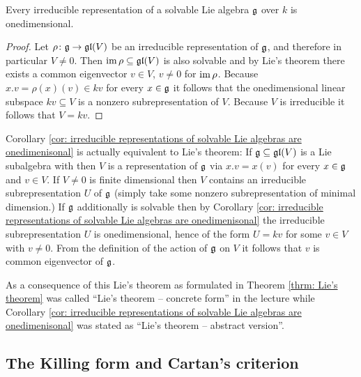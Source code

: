 \begin{cor}\label{cor: irreducible representations of solvable Lie algebras are onedimenisonal}
 Every irreducible representation of a solvable Lie algebra $\mathfrak{g}$ over $k$ is onedimensional.
\end{cor}
\begin{proof}
 Let $\rho \colon \mathfrak{g} \to \mathfrak{gl}(V)$ be an irreducible representation of $\mathfrak{g}$, and therefore in particular $V \neq 0$. Then $\operatorname{im} \rho \subseteq \mathfrak{gl}(V)$ is also solvable and by Lie’s theorem there exists a common eigenvector $v \in V$, $v \neq 0$ for $\operatorname{im} \rho$. Because $x.v = \rho(x)(v) \in kv$ for every $x \in \mathfrak{g}$ it follows that the onedimensional linear subspace $kv \subseteq V$ is a nonzero subrepresentation of $V$. Because $V$ is irreducible it follows that $V = kv$.
\end{proof}


\begin{rem}
 Corollary \ref{cor: irreducible representations of solvable Lie algebras are onedimenisonal} is actually equivalent to Lie’s theorem: If $\mathfrak{g} \subseteq \mathfrak{gl}(V)$ is a Lie subalgebra with then $V$ is a representation of $\mathfrak{g}$ via $x.v = x(v)$ for every $x \in \mathfrak{g}$ and $v \in V$. If $V \neq 0$ is finite dimensional then $V$ contains an irreducible subrepresentation $U$ of $\mathfrak{g}$ (simply take some nonzero subrepresentation of minimal dimension.) If $\mathfrak{g}$ additionally is solvable then by Corollary \ref{cor: irreducible representations of solvable Lie algebras are onedimenisonal} the irreducible subrepresentation $U$ is onedimensional, hence of the form $U = kv$ for some $v \in V$ with $v \neq 0$. From the definition of the action of $\mathfrak{g}$ on $V$ it follows that $v$ is common eigenvector of $\mathfrak{g}$.
 
 As a consequence of this Lie’s theorem as formulated in Theorem \ref{thrm: Lie’s theorem} was called ``Lie’s theorem -- concrete form'' in the lecture while Corollary \ref{cor: irreducible representations of solvable Lie algebras are onedimenisonal} was stated as ``Lie’s theorem -- abstract version''.
\end{rem}








\subsection{The Killing form and Cartan’s criterion}



